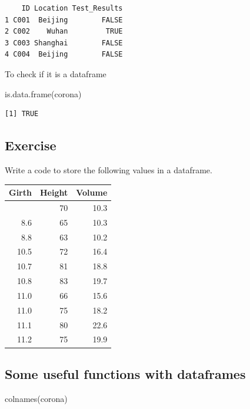 \documentclass[
  letterpaper,
  DIV=11,
  numbers=noendperiod]{scrreprt}
\newenvironment{Shaded}{\begin{snugshade}}{\end{snugshade}}
\newcommand{\FunctionTok}[1]{\textcolor[rgb]{0.28,0.35,0.67}{#1}}
\newcommand{\NormalTok}[1]{\textcolor[rgb]{0.00,0.23,0.31}{#1}}
\begin{document}
\begin{verbatim}
    ID Location Test_Results
1 C001  Beijing        FALSE
2 C002    Wuhan         TRUE
3 C003 Shanghai        FALSE
4 C004  Beijing        FALSE
\end{verbatim}

To check if it is a dataframe

\begin{Shaded}
\begin{Highlighting}[]
\FunctionTok{is.data.frame}\NormalTok{(corona)}
\end{Highlighting}
\end{Shaded}

\begin{verbatim}
[1] TRUE
\end{verbatim}

\subsection{Exercise}\label{exercise-5}

Write a code to store the following values in a dataframe.

\begin{longtable}[]{@{}rrr@{}}
\toprule\noalign{}
Girth & Height & Volume \\
\midrule\noalign{}
\endhead
\bottomrule\noalign{}
\endlastfoot
8.3 & 70 & 10.3 \\
8.6 & 65 & 10.3 \\
8.8 & 63 & 10.2 \\
10.5 & 72 & 16.4 \\
10.7 & 81 & 18.8 \\
10.8 & 83 & 19.7 \\
11.0 & 66 & 15.6 \\
11.0 & 75 & 18.2 \\
11.1 & 80 & 22.6 \\
11.2 & 75 & 19.9 \\
\end{longtable}

\subsection{Some useful functions with
dataframes}\label{some-useful-functions-with-dataframes}

\begin{Shaded}
\begin{Highlighting}[]
\FunctionTok{colnames}\NormalTok{(corona)}
\end{Highlighting}
\end{Shaded}
\end{document}
